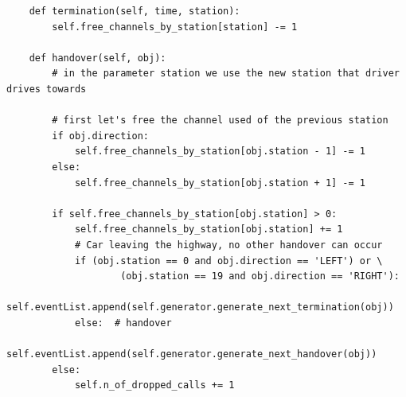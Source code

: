 \documentclass[12pt,a4paper]{article}
\begin{document}
\begin{lstlisting}
    def termination(self, time, station):
        self.free_channels_by_station[station] -= 1

    def handover(self, obj):
        # in the parameter station we use the new station that driver drives towards

        # first let's free the channel used of the previous station
        if obj.direction:
            self.free_channels_by_station[obj.station - 1] -= 1
        else:
            self.free_channels_by_station[obj.station + 1] -= 1

        if self.free_channels_by_station[obj.station] > 0:
            self.free_channels_by_station[obj.station] += 1
            # Car leaving the highway, no other handover can occur
            if (obj.station == 0 and obj.direction == 'LEFT') or \
                    (obj.station == 19 and obj.direction == 'RIGHT'):
                self.eventList.append(self.generator.generate_next_termination(obj))
            else:  # handover
                self.eventList.append(self.generator.generate_next_handover(obj))
        else:
            self.n_of_dropped_calls += 1
\end{lstlisting}
\end{document}
